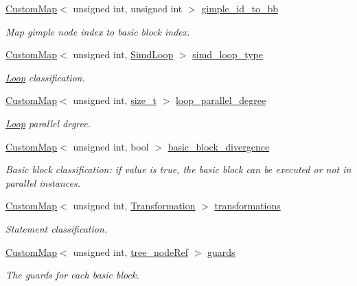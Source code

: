 \begin{DoxyCompactItemize}
\hyperlink{custom__map_8hpp_a18ca01763abbe3e5623223bfe5aaac6b}{Custom\+Map}$<$ unsigned int, unsigned int $>$ \hyperlink{classVectorize_a44e94b6872650e5a3d7af8e248a01d14}{gimple\+\_\+id\+\_\+to\+\_\+bb}
\begin{DoxyCompactList}\small\item\em Map gimple node index to basic block index. \end{DoxyCompactList}\item 
\hyperlink{custom__map_8hpp_a18ca01763abbe3e5623223bfe5aaac6b}{Custom\+Map}$<$ unsigned int, \hyperlink{classVectorize_a434b71764ac7af86698c3f2cee6e8a25}{Simd\+Loop} $>$ \hyperlink{classVectorize_a449629be4c36693f9c5ca0fb74ed0068}{simd\+\_\+loop\+\_\+type}
\begin{DoxyCompactList}\small\item\em \hyperlink{classLoop}{Loop} classification. \end{DoxyCompactList}\item 
\hyperlink{custom__map_8hpp_a18ca01763abbe3e5623223bfe5aaac6b}{Custom\+Map}$<$ unsigned int, \hyperlink{tutorial__fpt__2017_2intro_2sixth_2test_8c_a7c94ea6f8948649f8d181ae55911eeaf}{size\+\_\+t} $>$ \hyperlink{classVectorize_a07595ac2162b05302337bfe473b37a39}{loop\+\_\+parallel\+\_\+degree}
\begin{DoxyCompactList}\small\item\em \hyperlink{classLoop}{Loop} parallel degree. \end{DoxyCompactList}\item 
\hyperlink{custom__map_8hpp_a18ca01763abbe3e5623223bfe5aaac6b}{Custom\+Map}$<$ unsigned int, bool $>$ \hyperlink{classVectorize_a9cb02388e4050f92e61fe5d2b8849acf}{basic\+\_\+block\+\_\+divergence}
\begin{DoxyCompactList}\small\item\em Basic block classification\+: if value is true, the basic block can be executed or not in parallel instances. \end{DoxyCompactList}\item 
\hyperlink{custom__map_8hpp_a18ca01763abbe3e5623223bfe5aaac6b}{Custom\+Map}$<$ unsigned int, \hyperlink{vectorize_8hpp_a0176e2f61ce5ea7a3495a511cf46b2c1}{Transformation} $>$ \hyperlink{classVectorize_a6dde3b3f2f317c29b924ed156f940f59}{transformations}
\begin{DoxyCompactList}\small\item\em Statement classification. \end{DoxyCompactList}\item 
\hyperlink{custom__map_8hpp_a18ca01763abbe3e5623223bfe5aaac6b}{Custom\+Map}$<$ unsigned int, \hyperlink{tree__node_8hpp_a6ee377554d1c4871ad66a337eaa67fd5}{tree\+\_\+node\+Ref} $>$ \hyperlink{classVectorize_a7fa9592fc159a4d6c12cb9ce0d0d4ec8}{guards}
\begin{DoxyCompactList}\small\item\em The guards for each basic block. \end{DoxyCompactList}\end{DoxyCompactItemize}
